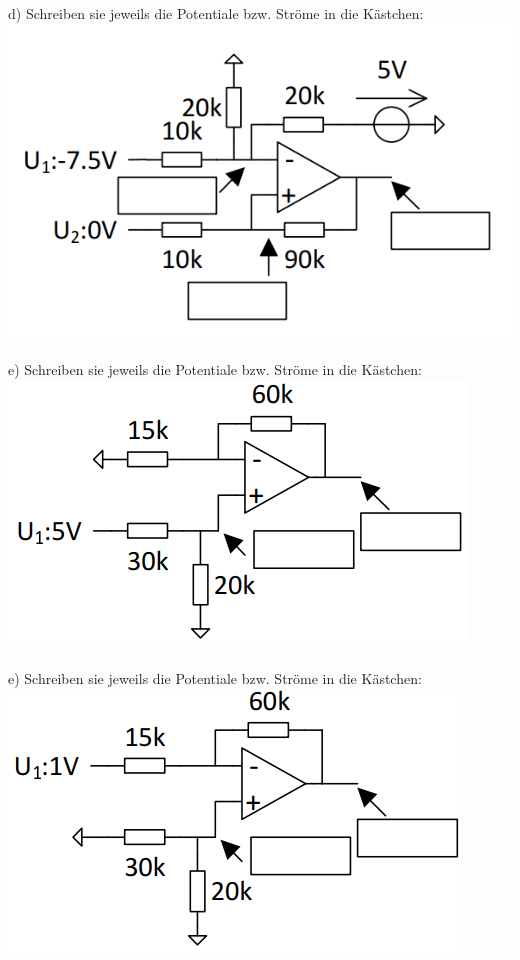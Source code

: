 \documentclass[A4]{scrartcl}
\begin{document}
  d) Schreiben sie jeweils die Potentiale bzw. Ströme in die Kästchen:\\
  \includegraphics{Schaltung5.png}\\\\
  e) Schreiben sie jeweils die Potentiale bzw. Ströme in die Kästchen:\\
  \includegraphics{Schaltung9.png}\\\\
  e) Schreiben sie jeweils die Potentiale bzw. Ströme in die Kästchen:\\
  \includegraphics{Schaltung10.png}\\\\
\end{document}
